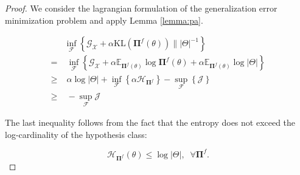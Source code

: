 \begin{proof}
    We consider the lagrangian formulation of the generalization error minimization problem 
    and apply Lemma \ref{lemma:pa}.

    $$
    \begin{aligned}
        & \inf_{\mathcal{F}} \left \{ \mathcal{G}_{\mathcal{X}} + \alpha \text{KL} (\mathbf{\Pi}^f(\theta)) \parallel |\Theta|^{-1} \right \} \\
        = & \; \inf_{\mathcal{F}} \left \{ \mathcal{G}_{\mathcal{X}} + \alpha \mathbb{E}_{\mathbf{\Pi}^f(\theta)} \log \mathbf{\Pi}^f(\theta) + \alpha \mathbb{E}_{\mathbf{\Pi}^f(\theta)} \log |\Theta| \right \} \\
        \geq & \; \alpha \log |\Theta| + \inf_{\mathcal{F}} \left \{ \alpha \mathcal{H}_{\mathbf{\Pi}^f} \right \} - \sup_{\mathcal{F}} \left \{ \mathcal{J} \right \} \\
        \geq & \; - \sup_{\mathcal{F}} \mathcal{J}
    \end{aligned}
    $$

    The last inequality follows from the fact that the entropy does not exceed the log-cardinality
    of the hypothesis class:

    $$
    \mathcal{H}_{\mathbf{\Pi}^f}(\theta) \leq \log |\Theta|, \;\; \forall \mathbf{\Pi}^f.
    $$
\end{proof}




